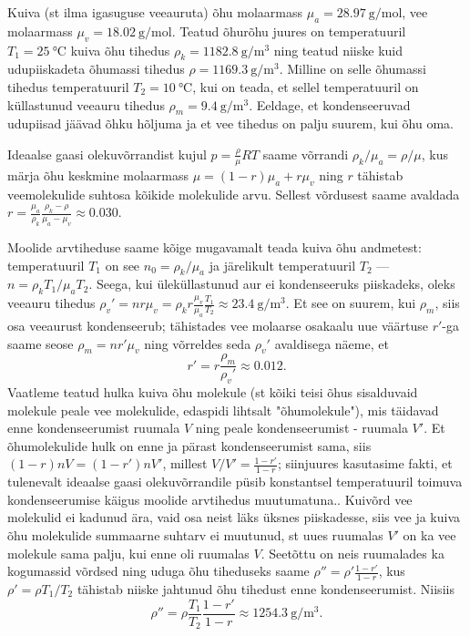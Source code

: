 
Kuiva (st ilma igasuguse veeauruta) õhu molaarmass $\mu_a=\SI{28.97}{\g\per\mole}$, vee molaarmass $\mu_v=\SI{18.02}{\g\per\mole}$. Teatud õhurõhu juures on temperatuuril $T_1=\SI{25}\celsius$ kuiva õhu tihedus $\rho_k=\SI{1182.8}{\g\per\m\cubed}$ ning teatud niiske kuid udupiiskadeta õhumassi tihedus $\rho=\SI{1169.3}{\g\per\m\cubed}$. Milline on selle õhumassi tihedus temperatuuril $T_2=\SI{10}\celsius$, kui on teada, et sellel temperatuuril on küllastunud veeauru tihedus $\rho_m=\SI{9.4}{\g\per\m\cubed}$. Eeldage, et kondenseeruvad udupiisad jäävad õhku hõljuma ja et vee tihedus on palju suurem, kui õhu oma.



\hint

\solu
Ideaalse gaasi olekuvõrrandist kujul $p=\frac \rho\mu RT$ saame võrrandi $\rho_k/\mu_a=\rho/\mu$, kus märja õhu keskmine molaarmass $\mu=(1-r)\mu_a+r\mu_v$ ning $r$ tähistab veemolekulide suhtosa kõikide molekulide arvu. Sellest võrdusest saame avaldada $r=\frac {\mu_a}{\rho_k}\frac{\rho_k-\rho}{\mu_a-\mu_v}\approx \num{0.030}$.

Moolide arvtiheduse saame kõige mugavamalt teada kuiva õhu andmetest: temperatuuril $T_1$ on see $n_0=\rho_k/\mu_a$ ja järelikult temperatuuril $T_2$ ---  $n=\rho_kT_1/\mu_aT_2$. Seega, kui üleküllastunud aur ei kondenseeruks piiskadeks, oleks veeauru tihedus $\rho_v'=nr\mu_v= \rho_kr\frac {\mu_v}{\mu_a}\frac{T_1}{T_2}\approx\SI{23.4}{\g\per\m\cubed}$. Et see on suurem, kui $\rho_m$, siis osa veeaurust kondenseerub; tähistades vee molaarse osakaalu uue väärtuse $r'$-ga saame seose $\rho_m=nr'\mu_v$ ning võrreldes seda $\rho_v'$ avaldisega näeme, et
\[
  r'=r\frac {\rho_m}{\rho_v'}\approx \num{0.012}.
\]
Vaatleme teatud hulka kuiva õhu molekule (st kõiki teisi õhus sisalduvaid molekule peale vee molekulide, edaspidi lihtsalt "õhumolekule"), mis täidavad enne kondenseerumist ruumala $V$ ning peale kondenseerumist - ruumala $V'$. Et õhumolekulide hulk on enne ja pärast kondenseerumist sama, siis $(1-r)nV=(1-r')nV'$, millest $V/V'=\frac{1-r'}{1-r}$; siinjuures kasutasime fakti, et tulenevalt ideaalse gaasi olekuvõrrandile püsib konstantsel temperatuuril toimuva kondenseerumise käigus moolide arvtihedus muutumatuna.. Kuivõrd vee molekulid ei kadunud ära, vaid osa neist läks üksnes piiskadesse, siis  vee ja kuiva õhu molekulide summaarne suhtarv ei muutunud, st uues ruumalas $V'$ on ka vee molekule sama palju, kui enne oli ruumalas $V$. Seetõttu on neis ruumalades ka kogumassid võrdsed ning uduga õhu tiheduseks saame  $\rho''=\rho'\frac{1-r'}{1-r}$, kus $\rho'=\rho T_1/T_2$ tähistab niiske jahtunud õhu tihedust enne kondenseerumist. Niisiis
\[\rho''=\rho \frac{T_1}{T_2} \frac{1-r'}{1-r}\approx \SI{1254.3}{\g\per\m\cubed}.\]
\probend